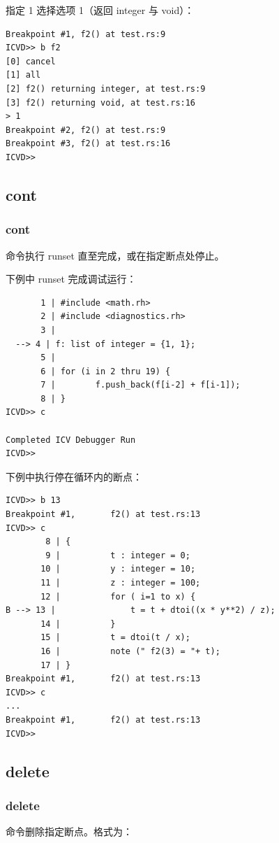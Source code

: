 \begin{enumerate}
指定 1 选择选项 1（返回 integer 与 void）：
\begin{lstlisting}
Breakpoint #1, f2() at test.rs:9
ICVD>> b f2
[0] cancel
[1] all
[2] f2() returning integer, at test.rs:9
[3] f2() returning void, at test.rs:16
> 1
Breakpoint #2, f2() at test.rs:9
Breakpoint #3, f2() at test.rs:16
ICVD>>
\end{lstlisting}
\end{enumerate}

\subsection{cont}
\subsubsection*{cont}

 命令执行 runset 直至完成，或在指定断点处停止。

下例中 runset 完成调试运行：
\begin{lstlisting}
       1 | #include <math.rh>
       2 | #include <diagnostics.rh>
       3 |
  --> 4 | f: list of integer = {1, 1};
       5 |
       6 | for (i in 2 thru 19) {
       7 |        f.push_back(f[i-2] + f[i-1]);
       8 | }
ICVD>> c

Completed ICV Debugger Run
ICVD>>
\end{lstlisting}

下例中执行停在循环内的断点：
\begin{lstlisting}
ICVD>> b 13
Breakpoint #1,       f2() at test.rs:13
ICVD>> c
        8 | {
        9 |          t : integer = 0;
       10 |          y : integer = 10;
       11 |          z : integer = 100;
       12 |          for ( i=1 to x) {
B --> 13 |               t = t + dtoi((x * y**2) / z);
       14 |          }
       15 |          t = dtoi(t / x);
       16 |          note (" f2(3) = "+ t);
       17 | }
Breakpoint #1,       f2() at test.rs:13
ICVD>> c
...
Breakpoint #1,       f2() at test.rs:13
ICVD>>
\end{lstlisting}

\subsection{delete}
\subsubsection*{delete}

 命令删除指定断点。格式为：

